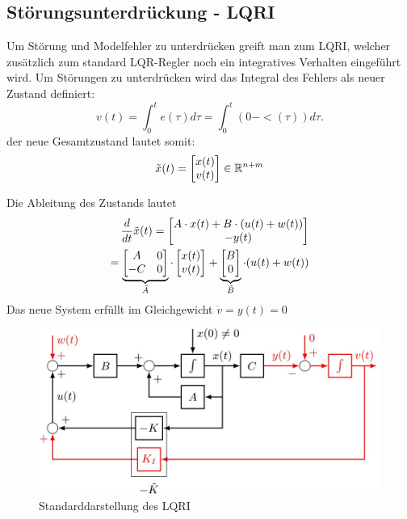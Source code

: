 \subsection{Störungsunterdrückung - LQRI}
Um Störung und Modelfehler zu unterdrücken greift man zum LQRI, welcher zusätzlich zum standard LQR-Regler noch ein integratives Verhalten eingeführt wird. Um Störungen zu unterdrücken wird das Integral des Fehlers als neuer Zustand definiert: \[ v(t) = \int^t_0 e(\tau)d\tau = \int^t_0 (0-<(\tau))d\tau.\]
der neue Gesamtzustand lautet somit: \[\Tilde{x}(t) =\begin{bmatrix}
x(t) \\ v(t)
\end{bmatrix}\in \mathbb{R}^{n+m}\]

Die Ableitung des Zustands lautet
\begin{align*}
    \frac{d}{dt}\Tilde{x}(t) = \begin{bmatrix}A\cdot x(t) + B \cdot ( u(t) + w(t))\\-y(t)\end{bmatrix}\\
    = \underbrace{\begin{bmatrix}A&0\\-C & 0\end{bmatrix}}_{\Tilde{A}}\cdot\begin{bmatrix}x(t) \\v(t)\end{bmatrix}+\underbrace{\begin{bmatrix}B \\ 0 \end{bmatrix}}_{\Tilde{B}} \cdot(u(t)+w(t))
\end{align*}
Das neue System erfüllt im Gleichgewicht $\dot v = y(t) = 0$

\begin{figure}[H]
    \centering
    \includegraphics[width=0.8\linewidth]{images/08/LQRI.jpg}
    \caption{Standarddarstellung des LQRI}
\end{figure}

